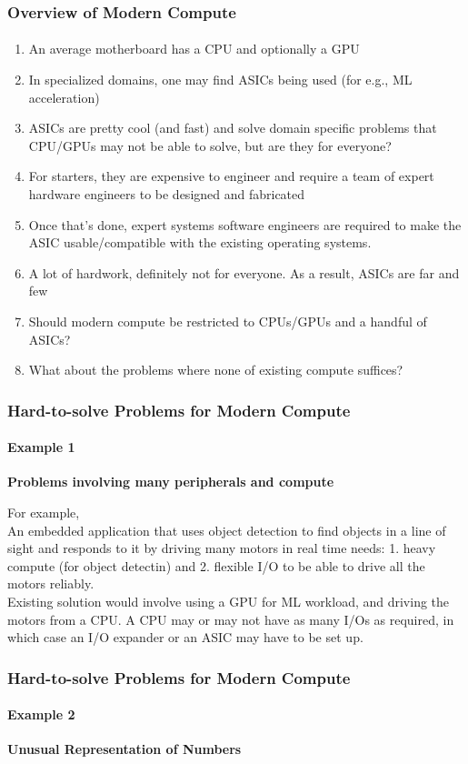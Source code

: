 \documentclass{beamer}
\begin{document}
{\begin{frame}[fragile]
\frametitle{Overview of Modern Compute}
\framesubtitle{}
  \begin{enumerate}
    \item An average motherboard has a CPU and optionally a GPU
    \item In specialized domains, one may find ASICs being used (for e.g., 
      ML acceleration)
    \item ASICs are pretty cool (and fast) and solve domain specific problems
      that CPU/GPUs may not be able to solve, but are they for everyone?
    \item For starters, they are expensive to engineer and require a team
      of expert hardware engineers to be designed and fabricated
    \item Once that's done, expert systems software engineers are required
      to make the ASIC usable/compatible with the existing operating systems.
    \item A lot of hardwork, definitely not for everyone.  As a result, ASICs are far and few
    \item Should modern compute be restricted to CPUs/GPUs and a handful
      of ASICs?
    \item What about the problems where none of existing compute suffices?
  \end{enumerate}
\end{frame}

\begin{frame}[fragile]
  \frametitle{Hard-to-solve Problems for Modern Compute}
  \framesubtitle{Example 1}
  \textbf{Problems involving many peripherals and compute}

  For example, \\

  An embedded application that uses object detection to find
  objects in a line of sight and responds to it by driving many motors in
  real time needs: 1. heavy compute (for object detectin) and 2. flexible I/O to be able to 
  drive all the motors reliably. \\

  Existing solution would involve using a GPU for ML workload, and
  driving the motors from a CPU. A CPU may or may not have as many I/Os
  as required, in which case an I/O expander or an ASIC may have to be set up.
\end{frame}

\begin{frame}[fragile]
  \frametitle{Hard-to-solve Problems for Modern Compute}
  \framesubtitle{Example 2}
  \textbf{Unusual Representation of Numbers}


\end{frame}}
\end{document}
